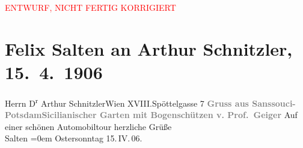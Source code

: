 
\begin{center}
            \textcolor{red}{ENTWURF, NICHT FERTIG KORRIGIERT}
                      \end{center}
            
         
         \renewcommand{\erwaehntePersonen}{Personen: Ernst Moritz Geyger}
         \renewcommand{\erwaehnteOrte}{Orte: Berlin, Edmund-Weiß-Gasse, Garten von Sanssouci, Schloss Sanssouci, Wien}
         \renewcommand{\erwaehnteWerke}{Werke: Bogenschütze}
               \section[Felix Salten an Arthur Schnitzler, 15. 4. 1906]{ Felix Salten an Arthur Schnitzler, 15. 4. 1906}\nopagebreak{}\rehead{ }\begin{ledgroupsized}[t]{13cm}\normalsize\beginnumbering \toendnotes[C]{\smallbreak\pagebreak[2]} 
\pstart{}{\pb}Herrn D\textsuperscript{r} Arthur Schnitzler\pend{}\pstart{}Wien XVIII.\pend{}\pstart{}Spöttelgasse 7\pend{}{\bigskip}\pstart
           \noindent{}{\pb}\textcolor{gray}{\textbf{Gruss aus Sanssouci-Potsdam}}\hfill \textcolor{gray}{\textbf{Sicilianischer
                     Garten mit Bogenschützen v.
                     Prof. Geiger}}\pend
           \pstart
           Auf einer schönen Automobiltour\pend
           \pstart
           herzliche Grüße{\\[\baselineskip]}\spacefill\mbox{Salten}\pend
           \leftskip=0em{}\pstart
           {\pb}Ostersonntag
                     15. IV. 06.\pend
           
         
         \endnumbering{}\end{ledgroupsized}\begin{anhang}\end{anhang}\newcommand{\dateiname}{L03418}\newcommand{\titel}{Felix Salten an Arthur Schnitzler, 15. 4. 1906}\newcommand{\editorInnen}{Martin Anton Müller und Laura Untner}
      